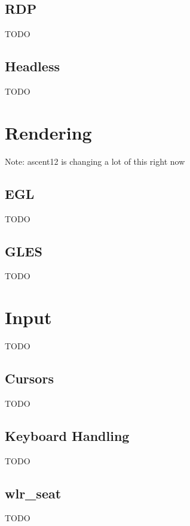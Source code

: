 \documentclass{article}
\begin{document}
\subsection{RDP}\label{rdp backend}

TODO

\subsection{Headless}\label{headless backend}

TODO

\newpage
\section{Rendering}\label{rendering}

Note: ascent12 is changing a lot of this right now

\subsection{EGL}

TODO

\subsection{GLES}

TODO

\newpage
\section{Input}\label{input}

TODO

\subsection{Cursors}\label{wlr cursor summary}

TODO

\subsection{Keyboard Handling}\label{keyboard handling}

TODO

\subsection{wlr_seat}\label{wlr seat summary}

TODO
\end{document}
